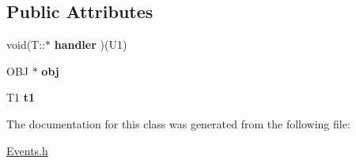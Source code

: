 \subsection*{Public Attributes}
\begin{DoxyCompactItemize}
\item 
\hypertarget{class_event1_a2a02ab5cbd37a2879c3db25cf3faf80f}{void(T\-::$\ast$ {\bfseries handler} )(U1)}\label{class_event1_a2a02ab5cbd37a2879c3db25cf3faf80f}

\item 
\hypertarget{class_event1_adc793df07c00b32a012cf45b31b9d2e6}{O\-B\-J $\ast$ {\bfseries obj}}\label{class_event1_adc793df07c00b32a012cf45b31b9d2e6}

\item 
\hypertarget{class_event1_a1af2759e05940a423f3b9409feab75f9}{T1 {\bfseries t1}}\label{class_event1_a1af2759e05940a423f3b9409feab75f9}

\end{DoxyCompactItemize}


The documentation for this class was generated from the following file\-:\begin{DoxyCompactItemize}
\item 
\hyperlink{_events_8h}{Events.\-h}\end{DoxyCompactItemize}
